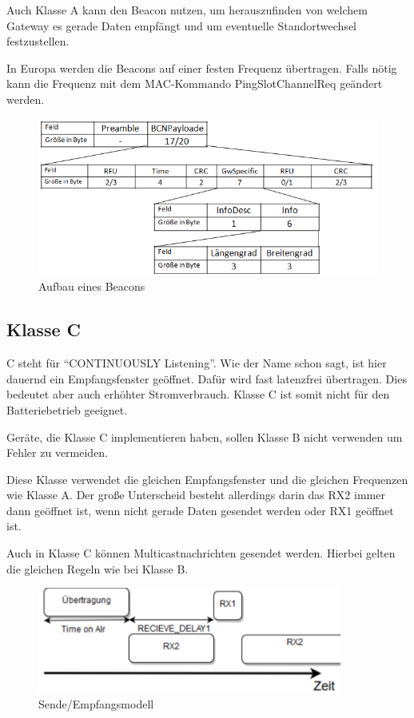 \documentclass[a4paper, 12pt]{article}
\begin{document}
                Auch Klasse A kann den Beacon nutzen, um herauszufinden von welchem Gateway es gerade Daten empfängt 
                und um eventuelle Standortwechsel festzustellen.
                
                In Europa werden die Beacons auf einer festen Frequenz übertragen. Falls nötig kann die Frequenz mit dem  
                MAC-Kommando PingSlotChannelReq geändert werden.

                \begin{figure}[ht]
                    \centering
                    \includegraphics[width=\textwidth]{Beacon}
                    \caption{Aufbau eines Beacons}
                \end{figure}
        \subsection{Klasse C}
            C steht für ``CONTINUOUSLY Listening''. Wie der Name schon sagt, ist hier dauernd ein Empfangsfenster geöffnet.
            Dafür wird fast latenzfrei übertragen. Dies bedeutet aber auch erhöhter Stromverbrauch. Klasse C ist somit 
            nicht für den Batteriebetrieb geeignet. 

            Geräte, die Klasse C implementieren haben, sollen Klasse B nicht verwenden um Fehler zu vermeiden.

            Diese Klasse verwendet die gleichen Empfangsfenster und die gleichen Frequenzen wie Klasse A. Der große 
            Unterscheid besteht allerdings darin das RX2 immer dann geöffnet ist, wenn nicht gerade Daten gesendet 
            werden oder RX1 geöffnet ist. 

            Auch in Klasse C können Multicastnachrichten gesendet werden. Hierbei gelten die gleichen 
            Regeln wie bei Klasse B.


            \begin{figure}[ht]
                \centering
                \includegraphics[width=10cm]{KlasseC}
                \caption{Sende/Empfangsmodell}
            \end{figure}
\end{document}
